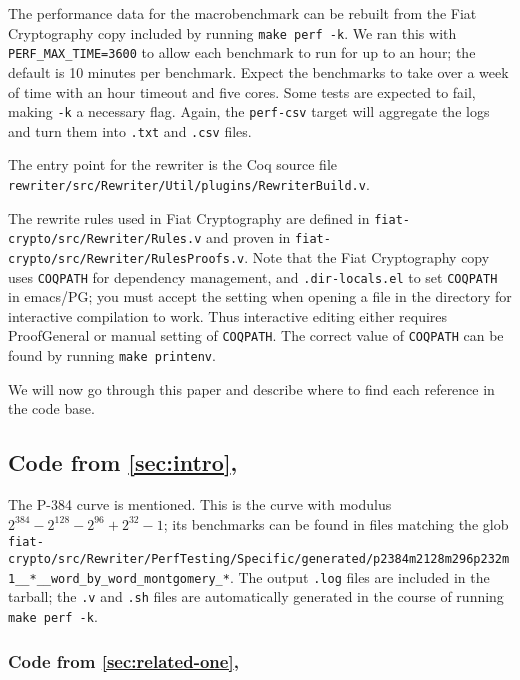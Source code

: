 \documentclass[a4paper,USenglish,cleveref,autoref,thm-restate]{lipics-v2021}
\begin{document}
\begin{minipage}[t][1cm]{\textwidth}
The performance data for the macrobenchmark can be rebuilt from the Fiat Cryptography copy included by running \texttt{make perf -k}.
We ran this with \texttt{PERF\_MAX\_TIME=3600} to allow each benchmark to run for up to an hour; the default is 10 minutes per benchmark.
Expect the benchmarks to take over a week of time with an hour timeout and five cores.
Some tests are expected to fail, making \texttt{-k} a necessary flag.
Again, the \texttt{perf-csv} target will aggregate the logs and turn them into \texttt{.txt} and \texttt{.csv} files.

The entry point for the rewriter is the Coq source file \texttt{rewriter/src/Rewriter/Util/plugins/RewriterBuild.v}.

The rewrite rules used in Fiat Cryptography are defined in \texttt{fiat-crypto/src/Rewriter/Rules.v} and proven in \texttt{fiat-crypto/src/Rewriter/RulesProofs.v}.
Note that the Fiat Cryptography copy uses \verb|COQPATH| for dependency management, and \verb|.dir-locals.el| to set \verb|COQPATH| in emacs/PG; you must accept the setting when opening a file in the directory for interactive compilation to work.
Thus interactive editing either requires ProofGeneral or manual setting of \verb|COQPATH|.
The correct value of \verb|COQPATH| can be found by running \verb|make printenv|.

We will now go through this paper and describe where to find each reference in the code base.

\newcommand{\autocommanameref}[1]{\autoref{#1}, \nameref{#1}}

\subsection{Code from \autocommanameref{sec:intro}}

The P-384 curve is mentioned.
This is the curve with modulus $2^{384} - 2^{128} - 2^{96} + 2^{32} - 1$; its benchmarks can be found in files matching the glob \texttt{fiat-crypto/src/Rewriter/PerfTesting/Specific/generated/p2384m2128m296p232m1\_\_*\_\_word\_by\_word\_montgomery\_*}.
The output \texttt{.log} files are included in the tarball; the \texttt{.v} and \texttt{.sh} files are automatically generated in the course of running \texttt{make perf -k}.

\subsubsection{Code from \autocommanameref{sec:related-one}}


\end{minipage}
\end{document}
